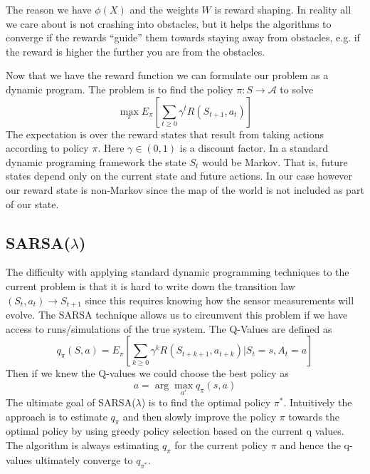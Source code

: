 \documentclass{article}
\begin{document}
The reason we have $\phi(X)$ and the weights $W$ is reward shaping. In reality all we care about is not crashing into obstacles, but it helps the algorithms to converge if the rewards ``guide'' them towards staying away from obstacles, e.g. if the reward is higher the further you are from the obstacles. 

Now that we have the reward function we can formulate our problem as a dynamic program. The problem is to find the policy $\pi:S \to \mathcal{A}$ to solve
%
%
\begin{equation}
\max_{\pi} E_{\pi} \left[ \sum_{t \geq 0} \gamma^t R(S_{t+1}, a_t) \right]
\end{equation}
%
%
The expectation is over the reward states that result from taking actions according to policy $\pi$. Here $\gamma \in (0,1)$ is a discount factor. In a standard dynamic programing framework the state $S_t$ would be Markov. That is, future states depend only on the current state and future actions. In our case however our reward state is non-Markov since the map of the world is not included as part of our state. 

\subsection{SARSA($\lambda$)}
\label{discrete_sarsa}
The difficulty with applying standard dynamic programming techniques to the current problem is that it is hard to write down the transition law $(S_t,a_t) \to S_{t+1}$ since this requires knowing how the sensor measurements will evolve. The SARSA technique allows us to circumvent this problem if we have access to runs/simulations of the true system. The Q-Values are defined as 
%
%
\begin{equation}
q_{\pi}(S,a) = E_{\pi} \left[ \sum_{k \geq 0} \gamma^k R(S_{t+k+1}, a_{t+k}) | S_t = s, A_t = a \right]
\end{equation}
%
%
Then if we knew the Q-values we could choose the best policy as 
%
\begin{equation}
\label{q-policy}
a = \arg \max_{a'} q_{\pi}(s,a) 
\end{equation}
%
The ultimate goal of SARSA($\lambda$) is to find the optimal policy $\pi^*$. Intuitively the approach is to estimate $q_{\pi}$ and then slowly improve the policy $\pi$ towards the optimal policy by using greedy policy selection based on the current q values. The algorithm is always estimating $q_{\pi}$ for the current policy $\pi$ and hence the q-values ultimately converge to $q_{\pi^*}$.
\end{document}
